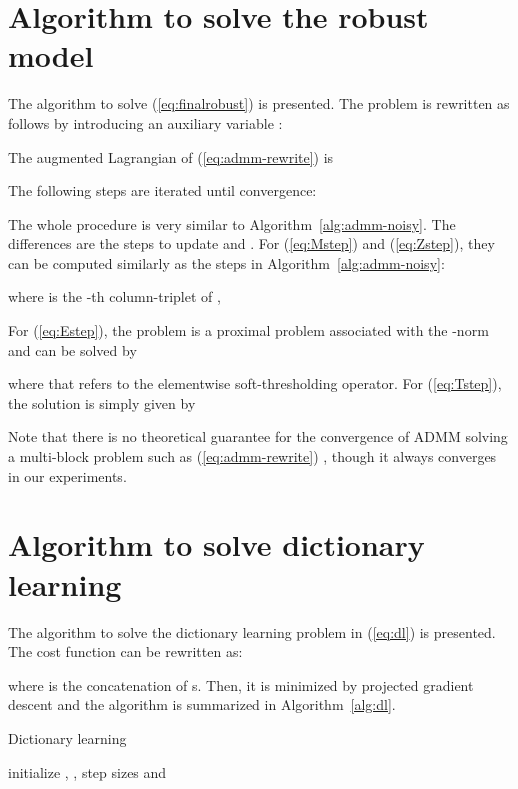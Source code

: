 \documentclass[10pt,journal,cspaper,compsoc]{IEEEtran}
\newcommand{\refEq}[1]{(\ref{#1})}
\newcommand{\refAlg}[1]{Algorithm~\ref{#1}}
\begin{document}
\appendices



\section{Algorithm to solve the robust model}\label{sec:alg-robust}

The algorithm to solve \refEq{eq:finalrobust} is presented. The problem is rewritten as follows by introducing an auxiliary variable :


The augmented Lagrangian of \refEq{eq:admm-rewrite} is


The following steps are iterated until convergence:

The whole procedure is very similar to \refAlg{alg:admm-noisy}. The differences are the steps to update  and . For \refEq{eq:Mstep} and \refEq{eq:Zstep}, they can be computed similarly as the steps in \refAlg{alg:admm-noisy}:

where  is the -th column-triplet of ,

For \refEq{eq:Estep}, the problem is a proximal problem associated with the -norm and can be solved by

where  that refers to the elementwise soft-thresholding operator. For \refEq{eq:Tstep}, the solution is simply given by


Note that there is no theoretical guarantee for the convergence of ADMM solving a multi-block problem such as \refEq{eq:admm-rewrite} \cite{chen2016direct}, though it always converges in our experiments.

\section{Algorithm to solve dictionary learning}\label{sec:alg-dl}

The algorithm to solve the dictionary learning problem in \refEq{eq:dl} is presented. The cost function can be rewritten as:

where  is the concatenation of s. Then, it is minimized by projected gradient descent and the algorithm is summarized in \refAlg{alg:dl}.

\begin{algorithm}\label{alg:dl}
\LinesNumbered
\caption{Dictionary learning}
\KwIn{}
\KwOut{}
\vspace{0.5em}
initialize , , step sizes  and \;
\end{algorithm}
\end{document}
